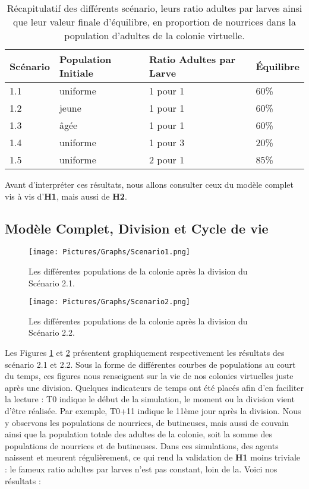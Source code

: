 	\begin{table}
		\centering
		\begin{tabular}{l|l|l|l}
    	Scénario & Population Initiale & Ratio Adultes par Larve & Équilibre \\
   		\hline
   		1.1 & uniforme & 1 pour 1 & 60\% \\
   		1.2 & jeune & 1 pour 1 & 60\% \\
   		1.3 & âgée & 1 pour 1 & 60\% \\
   		1.4 & uniforme & 1 pour 3 & 20\% \\
   		1.5 & uniforme & 2 pour 1 & 85\% \\
		\end{tabular}	
		\caption{Récapitulatif des différents scénario, leurs ratio adultes par larves ainsi que leur valeur finale d'équilibre, en proportion de nourrices dans la population d'adultes de la colonie virtuelle.}	
   		\label{TabEnvConstant}
	\end{table}	
	
	Avant d'interpréter ces résultats, nous allons consulter ceux du modèle complet vis à vis d'\textbf{H1}, mais aussi de \textbf{H2}.
	
	\subsection{Modèle Complet, Division et Cycle de vie}
	
	\begin{figure}
	\centering
	\texttt{[image: Pictures/Graphs/Scenario1.png]}
	\caption{Les différentes populations de la colonie après la division du Scénario 2.1.}
	\label{sc1}
	\end{figure}
	
	\begin{figure}
	\centering
	\texttt{[image: Pictures/Graphs/Scenario2.png]}
	\caption{Les différentes populations de la colonie après la division du Scénario 2.2.}
	\label{sc2}
	\end{figure}
	
	
	Les Figures \ref{sc1} et \ref{sc2} présentent graphiquement respectivement les résultats des scénario 2.1 et 2.2. Sous la forme de différentes courbes de populations au court du temps, ces figures nous renseignent sur la vie de nos colonies virtuelles juste après une division. Quelques indicateurs de temps ont été placés afin d'en faciliter la lecture : T0 indique le début de la simulation, le moment ou la division vient d'être réalisée. Par exemple, T0+11 indique le 11ème jour après la division. Nous y observons les populations de nourrices, de butineuses, mais aussi de couvain ainsi que la population totale des adultes de la colonie, soit la somme des populations de nourrices et de butineuses. Dans ces simulations, des agents naissent et meurent régulièrement, ce qui rend la validation de \textbf{H1} moins triviale : le fameux ratio adultes par larves n'est pas constant, loin de la. Voici nos résultats :
		
